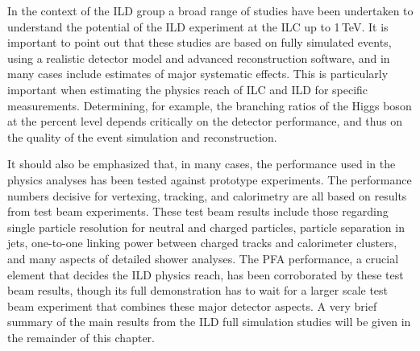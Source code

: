 
In the context of the ILD group a broad range of studies have been undertaken to understand the potential of the ILD experiment at the ILC up to 1\,TeV. 
It is important to point out that these studies are based on fully simulated events, using a realistic detector model and advanced reconstruction software, and in many cases include estimates of major systematic effects. This is particularly important when estimating the physics reach of ILC and ILD for specific measurements. Determining, for example, the branching ratios of the Higgs boson at the percent level depends critically on the detector performance, and thus on the quality of the event simulation and reconstruction.

It should also be emphasized that, in many cases, the performance used in the physics analyses has been tested against prototype experiments. The performance numbers decisive for vertexing, tracking, and calorimetry are all based on results from test beam experiments. These test beam results include those regarding single particle resolution for neutral and charged particles, particle separation in jets, one-to-one linking power between charged tracks and calorimeter clusters, and many aspects of detailed shower analyses. The PFA performance, a crucial element that decides the ILD physics reach, has been corroborated by these test beam results, though its full demonstration has to wait for a larger scale test beam experiment that combines these major detector aspects. 
A very brief summary of the main results from the ILD full simulation studies will be given in the remainder of this chapter.

